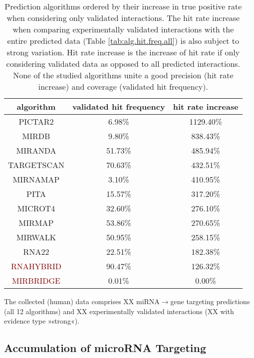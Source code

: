 \begin{table}
\centering
\begin{tabular}{c | c | c}
algorithm & validated hit frequency & hit rate increase\\ \hline
\hline
\textcolor{OliveGreen}{PICTAR2} & 6.98\% & 1129.40\%\\ \hline
\textcolor{OliveGreen}{MIRDB} & 9.80\% & 838.43\%\\ \hline
\textcolor{OliveGreen}{MIRANDA} & 51.73\% & 485.94\%\\ \hline
\textcolor{OliveGreen}{TARGETSCAN} & 70.63\% & 432.51\%\\ \hline
\textcolor{OliveGreen}{MIRNAMAP} & 3.10\% & 410.95\%\\ \hline
\textcolor{OliveGreen}{PITA} & 15.57\% & 317.20\%\\ \hline
\textcolor{OliveGreen}{MICROT4} & 32.60\% & 276.10\%\\ \hline
\textcolor{OliveGreen}{MIRMAP} & 53.86\% & 270.65\%\\ \hline
\textcolor{OliveGreen}{MIRWALK} & 50.95\% & 258.15\%\\ \hline
\textcolor{OliveGreen}{RNA22} & 22.51\% & 182.38\%\\ \hline
\textcolor{Maroon}{RNAHYBRID} & 90.47\% & 126.32\%\\ \hline
\textcolor{Maroon}{MIRBRIDGE} & 0.01\% & 0.00\%\\ \hline
\end{tabular}
\caption{Prediction algorithms ordered by their increase in true positive rate when considering only validated interactions. The hit rate increase when comparing experimentally validated interactions with the entire predicted data (Table \ref{tab:alg.hit.freq.all}) is also subject to strong variation. Hit rate increase is the increase of hit rate if only considering validated data as opposed to all predicted interactions. None of the studied algorithms unite a good precision (hit rate increase) and coverage (validated hit frequency).}
\label{tab:alg.hit.freq.val}
\end{table}


The collected (human) data comprises XX miRNA$\to$gene targeting predictions (all 12 algorithms) and XX experimentally validated interactions (XX with evidence type »strong«).

\subsection{Accumulation of microRNA Targeting}

